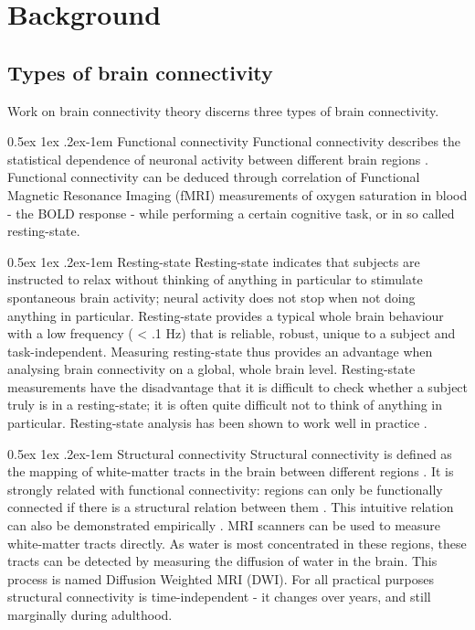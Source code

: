 \documentclass[a4paper, 10pt, english, onecolumn]{article}
\makeatletter
\renewcommand{\paragraph}{%
  \@startsection{paragraph}{4}%
  {\z@}{0.5ex \@plus 1ex \@minus .2ex}{-1em}%
  {\normalfont\normalsize\bfseries}%
}
\makeatother
\begin{document}
\section{Background}
\subsection{Types of brain connectivity}
Work on brain connectivity theory discerns three types of brain connectivity.

\paragraph{Functional connectivity}
Functional connectivity describes the statistical dependence of neuronal activity between different brain regions \cite{friston1993functional}.
Functional connectivity can be deduced through correlation of Functional Magnetic Resonance Imaging (fMRI) measurements of oxygen saturation  in blood - the BOLD response - while performing a certain cognitive task, or in so called resting-state.

\paragraph{Resting-state}
Resting-state indicates that subjects are instructed to relax without thinking of anything in particular to stimulate spontaneous brain activity; neural activity does not stop when not doing anything in particular.
Resting-state provides a typical whole brain behaviour with a low frequency ( < .1 Hz) that is reliable, robust, unique to a subject and task-independent.
Measuring resting-state thus provides an advantage when analysing brain connectivity on a global, whole brain level.
Resting-state measurements have the disadvantage that it is difficult to check whether a subject truly is in a resting-state; it is often quite difficult not to think of anything in particular.
Resting-state analysis has been shown to work well in practice \cite{Lowe2000, doria2010, Bullmore2009}.

\paragraph{Structural connectivity}
Structural connectivity is defined as the mapping of white-matter tracts in the brain between different regions \cite{friston1994}.
It is strongly related with functional connectivity: regions can only be functionally connected if there is a structural relation between them \cite{cabral2012}.
This intuitive relation can also be demonstrated empirically \cite{vandenheuvel2009}.
MRI scanners can be used to measure white-matter tracts directly.
As water is most concentrated in these regions, these tracts can be detected by measuring the diffusion of water in the brain.
This process is named Diffusion Weighted MRI (DWI).
For all practical purposes structural connectivity is time-independent - it changes over years, and still marginally during adulthood.
\end{document}
